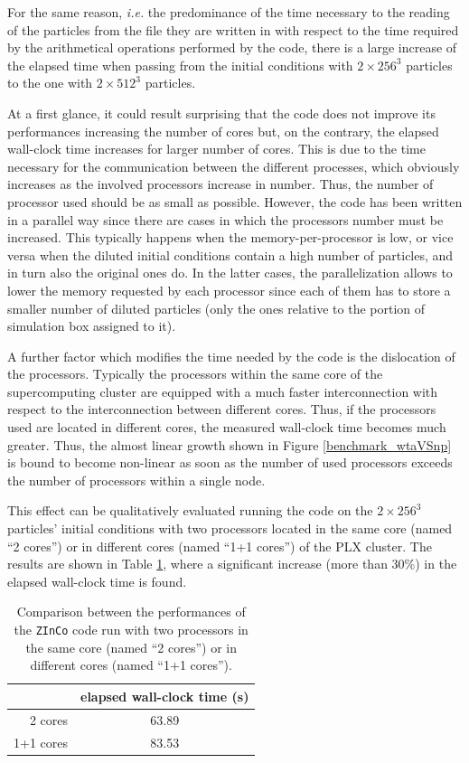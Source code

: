 \documentclass[11pt,a4paper,titlepage]{article}
\newcommand{\virg}[1]{``{#1}''}
\newcommand{\ie}{\emph{i.e.}\xspace}
\newcommand{\zinco}{\texttt{ZInCo}\xspace}
\begin{document}
For the same reason, \ie the predominance of the time necessary to the reading of the particles from the file they are written in with respect to the time required by the arithmetical operations performed by the code, there is a large increase of the elapsed time when passing from the initial conditions with $2 \times 256^3$ particles to the one with $2 \times 512^3$ particles.

At a first glance, it could result surprising that the code does not improve its performances increasing the number of cores but, on the contrary, the elapsed wall-clock time increases for larger number of cores. This is due to the time necessary for the communication between the different processes, which  obviously increases as the involved processors increase in number. Thus, the number of processor used should be as small as possible. However, the code has been written in a parallel way since there are cases in which the processors number must be increased. This typically happens when the memory-per-processor is low, or vice versa when the diluted initial conditions contain a high number of particles, and in turn also the original ones do. In the latter cases, the parallelization allows to lower the memory requested by each processor since each of them has to store a smaller number of diluted particles (only the ones relative to the portion of simulation box assigned to it).

A further factor which modifies the time needed by the code is the dislocation of the processors. Typically the processors within the same core of the supercomputing cluster are equipped with a much faster interconnection with respect to the interconnection between different cores. Thus, if the processors used are located in different cores, the measured wall-clock time becomes much greater. Thus, the almost linear growth shown in Figure \ref{benchmark_wtaVSnp} is bound to become non-linear as soon as the number of used processors exceeds the number of processors within a single node.

This effect can be qualitatively evaluated running the code on the $2 \times 256^3$ particles' initial conditions with two processors located in the same core (named \virg{2 cores}) or in different cores (named \virg{1+1 cores}) of the PLX cluster. The results are shown in Table \ref{benchmark_2VS1+1}, where a significant increase (more than 30\%) in the elapsed wall-clock time is found.

\begin{table}[!h]
\centering
\begin{tabular}{r|c}
          &    elapsed wall-clock time (s) \\
\hline
2 cores   &    63.89 \\
1+1 cores &    83.53  \\
\end{tabular}
\caption{Comparison between the performances of the \zinco code run with two processors in the same core (named \virg{2 cores}) or in different cores (named \virg{1+1 cores}).}
\label{benchmark_2VS1+1}
\end{table}
\end{document}
